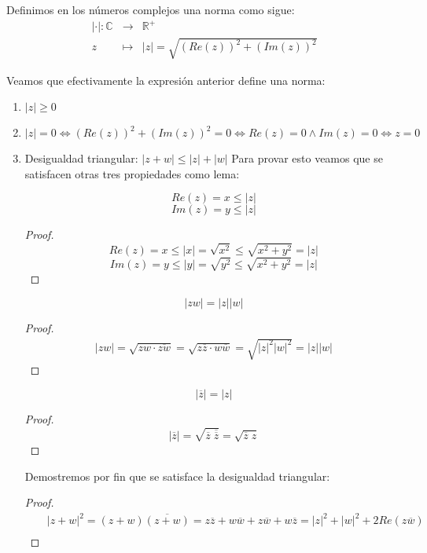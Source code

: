 \begin{definicion}[Norma]
  Definimos en los números complejos una norma como sigue:
  \begin{eqnarray*}
    |\cdot| : \mathbb{C}^{ } & \rightarrow & \mathbb{R}^{+} \\
                           z & \mapsto & |z|=\sqrt{(Re(z))^2+(Im(z))^2}
  \end{eqnarray*}
\end{definicion}

Veamos que efectivamente la expresión anterior define una norma:
\begin{enumerate}
  \item \(|z| \geq 0 \)
  \item \( |z| = 0 \Leftrightarrow (Re(z))^2+(Im(z))^2= 0 \Leftrightarrow Re(z) = 0 \wedge Im(z) = 0 \Leftrightarrow z = 0 \) 
  \item Desigualdad triangular: \( |z+w| \leq |z|+|w| \)
    Para provar esto veamos que se satisfacen otras tres propiedades como lema:
    \begin{lema}[3.1]
      \[ Re(z) = x \leq  |z|\]
      \[ Im(z) = y \leq |z|\]
      \begin{proof}
      \[ Re(z) = x \leq |x| = \sqrt{x^2} \leq \sqrt{x^2+y^2} = |z|\]
      \[ Im(z) = y \leq |y| = \sqrt{y^2} \leq \sqrt{x^2+y^2} = |z|\]
      \end{proof}
    \end{lema}
    \begin{lema}[3.2]
      \[|zw| = |z||w|\]
      \begin{proof}
        \begin{eqnarray*}
          |zw| = \sqrt{zw \cdot \overline{zw}} = \sqrt{z \overline{z} \cdot w \overline{w}} = \sqrt{|z|^2|w|^2} = |z||w|  
        \end{eqnarray*}
      \end{proof}
    \end{lema}
    \begin{lema}[3.3]
      \[|\overline{z}| = |z|\]
      \begin{proof}
        \[|\overline{z}| = \sqrt{\overline{z}\; \overline{\overline{z}}}= \sqrt{\overline{z}\; z} \]
      \end{proof}
    \end{lema}
    Demostremos por fin que se satisface la desigualdad triangular:
    \begin{proof}
      \begin{eqnarray*}
        & & |z+w|^2 = (z+w)\overline{(z+w)} = z\overline{z} + w\overline{w} + z\overline{w} + w\overline{z} = |z|^2+|w|^2+2Re(z\overline{w}) \\

\end{eqnarray*}
\end{proof}
\end{enumerate}
